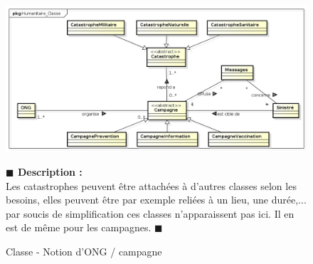 \documentclass[11pt, titlepage]{report}
\newcommand{\debutDescription}{\noindent\textbf{\textcolor{DescriptionColor}{$\blacksquare$  Description : \\}}}
\newcommand{\finDescription}{\noindent\textcolor{DescriptionColor}{$\blacksquare$}}
\begin{document}
\begin{figure}[h!]
\begin{center}
\includegraphics[scale=.4]{../images/diagrammes/uml/exigence_2/classe_exigence_2.png} 
\caption{Classe - Notion d'ONG / campagne}
\end{center}
\debutDescription
Les catastrophes peuvent être attachées à d'autres classes selon les besoins, elles peuvent être par exemple reliées à un lieu, une durée,... par soucis de simplification ces classes n'apparaissent pas ici. Il en est de même pour les campagnes.
\finDescription
\end{figure}
\end{document}
